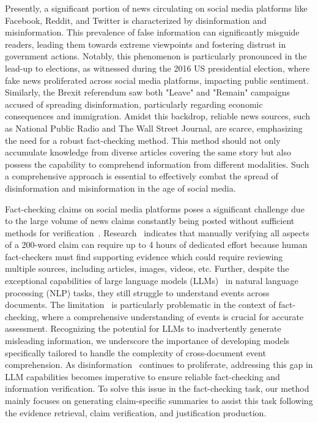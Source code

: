 Presently, a significant portion of news circulating on social media platforms like Facebook, Reddit, and Twitter is characterized by disinformation and misinformation. This prevalence of false information can significantly misguide readers, leading them towards extreme viewpoints and fostering distrust in government actions. Notably, this phenomenon is particularly pronounced in the lead-up to elections, as witnessed during the 2016 US presidential election, where fake news proliferated across social media platforms, impacting public sentiment. Similarly, the Brexit referendum saw both "Leave" and "Remain" campaigns accused of spreading disinformation, particularly regarding economic consequences and immigration. Amidst this backdrop, reliable news sources, such as National Public Radio and The Wall Street Journal, are scarce, emphasizing the need for a robust fact-checking method. This method should not only accumulate knowledge from diverse articles covering the same story but also possess the capability to comprehend information from different modalities. Such a comprehensive approach is essential to effectively combat the spread of disinformation and misinformation in the age of social media.

Fact-checking claims on social media platforms poses a significant challenge due to the large volume of news claims constantly being posted without sufficient methods for verification~\cite{1_Aimeur2023_cb}. Research~\cite{2_borel2018state} indicates that manually verifying all aspects of a 200-word claim can require up to 4 hours of dedicated effort because human fact-checkers must find supporting evidence which could require reviewing multiple sources, including articles, images, videos, etc. Further, despite the exceptional capabilities of large language models (LLMs)~\cite{touvron2023llama} in natural language processing (NLP) tasks, they still struggle to understand events across documents. The limitation~\cite{3_Jakesch_2023, 4_Jakesch_2023_1,5_kreps_mccain_brundage_2022, 6_goldstein2023generative, 7_spitale2023ai} is particularly problematic in the context of fact-checking, where a comprehensive understanding of events is crucial for accurate assessment. Recognizing the potential for LLMs to inadvertently generate misleading information, we underscore the importance of developing models specifically tailored to handle the complexity of cross-document event comprehension. As disinformation~\cite{8_shu2017fake,9_doi:10.1126/science.aap9559} continues to proliferate, addressing this gap in LLM capabilities becomes imperative to ensure reliable fact-checking and information verification. To solve this issue in the fact-checking task, our method mainly focuses on generating claim-specific summaries to assist this task following the evidence retrieval, claim verification, and justification production.